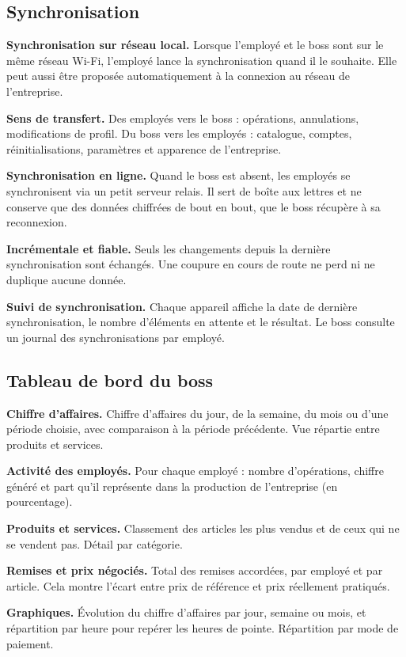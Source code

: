 \documentclass[11pt,a4paper]{article}
\newcommand{\fonc}[2]{\textbf{#1.} #2\par\vspace{0.2em}}
\begin{document}
	\subsection{Synchronisation}
	
	\fonc{Synchronisation sur réseau local}{Lorsque l'employé et le boss sont sur le même réseau Wi-Fi, l'employé lance la synchronisation quand il le souhaite. Elle peut aussi être proposée automatiquement à la connexion au réseau de l'entreprise.}
	
	\fonc{Sens de transfert}{Des employés vers le boss : opérations, annulations, modifications de profil. Du boss vers les employés : catalogue, comptes, réinitialisations, paramètres et apparence de l'entreprise.}
	
	\fonc{Synchronisation en ligne}{Quand le boss est absent, les employés se synchronisent via un petit serveur relais. Il sert de boîte aux lettres et ne conserve que des données chiffrées de bout en bout, que le boss récupère à sa reconnexion.}
	
	\fonc{Incrémentale et fiable}{Seuls les changements depuis la dernière synchronisation sont échangés. Une coupure en cours de route ne perd ni ne duplique aucune donnée.}
	
	\fonc{Suivi de synchronisation}{Chaque appareil affiche la date de dernière synchronisation, le nombre d'éléments en attente et le résultat. Le boss consulte un journal des synchronisations par employé.}
	
	\subsection{Tableau de bord du boss}
	
	\fonc{Chiffre d'affaires}{Chiffre d'affaires du jour, de la semaine, du mois ou d'une période choisie, avec comparaison à la période précédente. Vue répartie entre produits et services.}
	
	\fonc{Activité des employés}{Pour chaque employé : nombre d'opérations, chiffre généré et part qu'il représente dans la production de l'entreprise (en pourcentage).}
	
	\fonc{Produits et services}{Classement des articles les plus vendus et de ceux qui ne se vendent pas. Détail par catégorie.}
	
	\fonc{Remises et prix négociés}{Total des remises accordées, par employé et par article. Cela montre l'écart entre prix de référence et prix réellement pratiqués.}
	
	\fonc{Graphiques}{Évolution du chiffre d'affaires par jour, semaine ou mois, et répartition par heure pour repérer les heures de pointe. Répartition par mode de paiement.}
	
\end{document}

